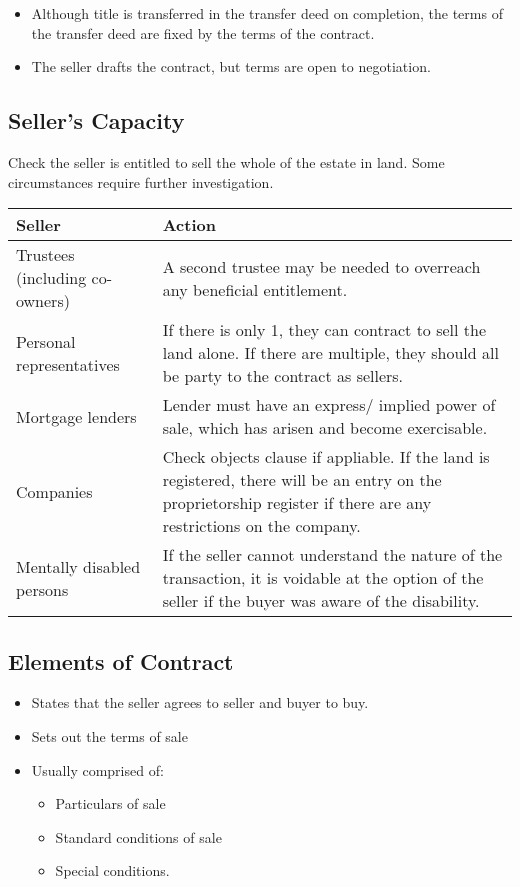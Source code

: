 \documentclass[
]{article}
\providecommand{\tightlist}{%
  \setlength{\itemsep}{0pt}\setlength{\parskip}{0pt}}
\begin{document}
\begin{itemize}
\tightlist
\item
  Although title is transferred in the transfer deed on completion, the
  terms of the transfer deed are fixed by the terms of the contract.
\item
  The seller drafts the contract, but terms are open to negotiation.
\end{itemize}

\hypertarget{sellers-capacity}{%
\subsection{Seller's Capacity}\label{sellers-capacity}}

Check the seller is entitled to sell the whole of the estate in land.
Some circumstances require further investigation.

\begin{longtable}[]{@{}ll@{}}
\toprule()
Seller & Action \\
\midrule()
\endhead
Trustees (including co-owners) & A second trustee may be needed to
overreach any beneficial entitlement. \\
Personal representatives & If there is only 1, they can contract to sell
the land alone. If there are multiple, they should all be party to the
contract as sellers. \\
Mortgage lenders & Lender must have an express/ implied power of sale,
which has arisen and become exercisable. \\
Companies & Check objects clause if appliable. If the land is
registered, there will be an entry on the proprietorship register if
there are any restrictions on the company. \\
Mentally disabled persons & If the seller cannot understand the nature
of the transaction, it is voidable at the option of the seller if the
buyer was aware of the disability. \\
\bottomrule()
\end{longtable}

\hypertarget{elements-of-contract}{%
\subsection{Elements of Contract}\label{elements-of-contract}}

\begin{itemize}
\tightlist
\item
  States that the seller agrees to seller and buyer to buy.
\item
  Sets out the terms of sale
\item
  Usually comprised of:

  \begin{itemize}
  \tightlist
  \item
    Particulars of sale
  \item
    Standard conditions of sale
  \item
    Special conditions.
  \end{itemize}
\end{itemize}
\end{document}
